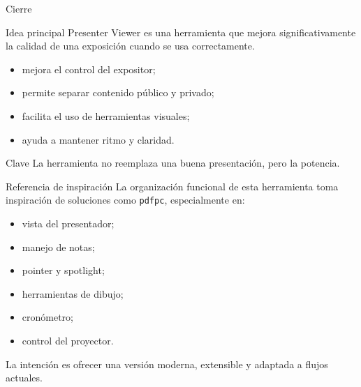 \documentclass[aspectratio=169,professionalfonts]{beamer}
\newcommand{\soft}[1]{\textcolor{PVSlate}{#1}}
\begin{document}
\begin{frame}{Cierre}
\begin{block}{Idea principal}
Presenter Viewer es una herramienta que mejora significativamente la calidad de una exposición cuando se usa correctamente.
\end{block}

\begin{itemize}
  \item mejora el control del expositor;
  \item permite separar contenido público y privado;
  \item facilita el uso de herramientas visuales;
  \item ayuda a mantener ritmo y claridad.
\end{itemize}

\begin{exampleblock}{Clave}
La herramienta no reemplaza una buena presentación, pero la potencia.
\end{exampleblock}

\end{frame}

\begin{frame}{Referencia de inspiración}
La organización funcional de esta herramienta toma inspiración de soluciones como \texttt{pdfpc}, especialmente en:

\begin{itemize}
    \item vista del presentador;
    \item manejo de notas;
    \item pointer y spotlight;
    \item herramientas de dibujo;
    \item cronómetro;
    \item control del proyector.
\end{itemize}

\soft{La intención es ofrecer una versión moderna, extensible y adaptada a flujos actuales.}

\end{frame}
\end{document}
